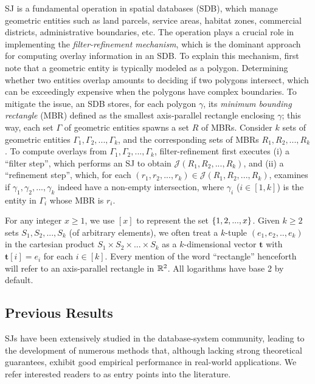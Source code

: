 \documentclass[sigconf]{acmart}
\def\vgap{\vspace{0mm}}
\def\extraspacing{\vspace{1.5mm} \noindent}
\def\J{\mathcal{J}}
\begin{document}
\vgap

SJ is a fundamental operation in spatial databases (SDB), which manage geometric entities such as land parcels, service areas, habitat zones, commercial districts, administrative boundaries, etc. The operation plays a crucial role in implementing the {\em filter-refinement mechanism}, which is the dominant approach for computing overlay information in an SDB. To explain this mechanism, first note that a geometric entity is typically modeled as a polygon. Determining whether two entities overlap amounts to deciding if two polygons intersect, which can be exceedingly expensive when the polygons have complex boundaries. To mitigate the issue, an SDB stores, for each polygon $\gamma$, its {\em minimum bounding rectangle} (MBR) defined as the smallest axis-parallel rectangle enclosing $\gamma$; this way, each set $\Gamma$ of geometric entities spawns a set $R$ of MBRs. Consider $k$ sets of geometric entities $\Gamma_1, \Gamma_2, ..., \Gamma_k$, and the corresponding sets of MBRs $R_1, R_2, ..., R_k$. To compute overlays from $\Gamma_1, \Gamma_2, ..., \Gamma_k$, filter-refinement first executes (i) a ``filter step'', which performs an SJ to obtain $\J(R_1, R_2, ..., R_k)$, and (ii) a ``refinement step'', which, for each $(r_1, r_2, ..., r_k) \in \J(R_1, R_2, ..., R_k)$, examines if $\gamma_1, \gamma_2, ..., \gamma_k$ indeed have a non-empty intersection, where $\gamma_i$ ($i \in [1, k]$) is the entity in $\Gamma_i$ whose MBR is $r_i$.


\extraspacing {\bf Math Conventions.} For any integer $x \ge 1$, we use $[x]$ to represent the set $\{1, 2, ..., x\}$. Given $k \ge 2$ sets $S_1, S_2, ..., S_k$ (of arbitrary elements), we often treat a $k$-tuple $(e_1, e_2, .., e_k)$ in the cartesian product $S_1 \times S_2 \times ... \times S_k$ as a $k$-dimensional vector $\bm{t}$ with $\bm{t}[i] = e_i$ for each $i \in [k]$. Every mention of the word ``rectangle'' henceforth will refer to an axis-parallel rectangle in $\mathbb{R}^2$. All logarithms have base 2 by default.

\subsection{Previous Results} \label{sec:intro:prev}

SJs have been extensively studied in the database-system community, leading to the development of numerous methods that, although lacking strong theoretical guarantees, exhibit good empirical performance in real-world applications. We refer interested readers to \cite{apr+00,bks93,gcn+13,js07,ks97,lr94,lr96,mp98,mp01,mp03,pd96,pmt99} as entry points into the literature.
\end{document}
